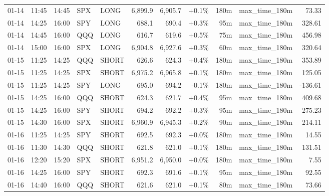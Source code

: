 \documentclass[11pt,a4paper,twoside]{article}
\begin{document}
\begin{center}
\begin{longtable}{>{\color{txtmain}}l l l l l r r r r >{\color{txtmain}}l r}
01-14 & 11:45 & 14:45 & SPX & LONG & 6,899.9 & 6,905.7 & \textcolor{wingreen}{+0.1\%} & 180m & max\_time\_180m & \textcolor{wingreen}{73.33} \\
01-14 & 14:25 & 16:00 & SPY & LONG & 688.1 & 690.4 & \textcolor{wingreen}{+0.3\%} & 95m & max\_time\_180m & \textcolor{wingreen}{328.61} \\
01-14 & 14:45 & 16:00 & QQQ & LONG & 616.7 & 619.6 & \textcolor{wingreen}{+0.5\%} & 75m & max\_time\_180m & \textcolor{wingreen}{456.98} \\
01-14 & 15:00 & 16:00 & SPX & LONG & 6,904.8 & 6,927.6 & \textcolor{wingreen}{+0.3\%} & 60m & max\_time\_180m & \textcolor{wingreen}{320.64} \\
01-15 & 11:25 & 14:25 & QQQ & SHORT & 626.6 & 624.3 & \textcolor{wingreen}{+0.4\%} & 180m & max\_time\_180m & \textcolor{wingreen}{353.89} \\
01-15 & 11:25 & 14:25 & SPX & SHORT & 6,975.2 & 6,965.8 & \textcolor{wingreen}{+0.1\%} & 180m & max\_time\_180m & \textcolor{wingreen}{125.05} \\
01-15 & 11:25 & 14:25 & SPY & LONG & 695.0 & 694.2 & \textcolor{lossred}{-0.1\%} & 180m & max\_time\_180m & \textcolor{lossred}{-136.61} \\
01-15 & 14:25 & 16:00 & QQQ & SHORT & 624.3 & 621.7 & \textcolor{wingreen}{+0.4\%} & 95m & max\_time\_180m & \textcolor{wingreen}{409.68} \\
01-15 & 14:25 & 16:00 & SPY & SHORT & 694.2 & 692.2 & \textcolor{wingreen}{+0.3\%} & 95m & max\_time\_180m & \textcolor{wingreen}{275.23} \\
01-15 & 14:30 & 16:00 & SPX & SHORT & 6,960.9 & 6,945.3 & \textcolor{wingreen}{+0.2\%} & 90m & max\_time\_180m & \textcolor{wingreen}{214.11} \\
01-16 & 11:25 & 14:25 & SPY & SHORT & 692.5 & 692.3 & \textcolor{wingreen}{+0.0\%} & 180m & max\_time\_180m & \textcolor{wingreen}{14.55} \\
01-16 & 11:30 & 14:30 & QQQ & SHORT & 621.8 & 621.0 & \textcolor{wingreen}{+0.1\%} & 180m & max\_time\_180m & \textcolor{wingreen}{131.51} \\
01-16 & 12:20 & 15:20 & SPX & SHORT & 6,951.2 & 6,950.0 & \textcolor{wingreen}{+0.0\%} & 180m & max\_time\_180m & \textcolor{wingreen}{7.55} \\
01-16 & 14:25 & 16:00 & SPY & SHORT & 692.3 & 691.6 & \textcolor{wingreen}{+0.1\%} & 95m & max\_time\_180m & \textcolor{wingreen}{92.55} \\
01-16 & 14:40 & 16:00 & QQQ & SHORT & 621.6 & 621.0 & \textcolor{wingreen}{+0.1\%} & 80m & max\_time\_180m & \textcolor{wingreen}{73.66} \\

\end{longtable}
\end{center}
\end{document}
